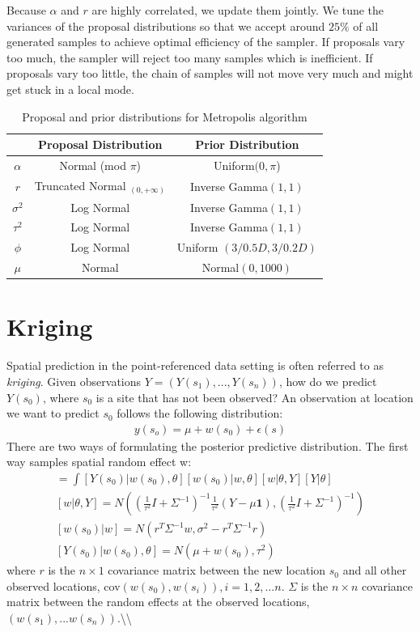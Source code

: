\documentclass[12pt,twoside]{dukestatscithesis}
\theoremstyle{definition}
\theoremstyle{definition}
\theoremstyle{definition}
\theoremstyle{remark}
\begin{document}
Because \(\alpha\) and \(r\) are highly correlated, we update them
jointly. We tune the variances of the proposal distributions so that we
accept around \(25\%\) of all generated samples to achieve optimal
efficiency of the sampler. If proposals vary too much, the sampler will
reject too many samples which is inefficient. If proposals vary too
little, the chain of samples will not move very much and might get stuck
in a local mode.
\begin{table}[H]
\centering
\setlength{\extrarowheight}{10pt}
\begin{tabular}{|c|c|c|}
\hline
 & Proposal Distribution & Prior Distribution\\[8pt]
\hline
$\alpha$ & Normal (mod $\pi$) & Uniform$(0, \pi$)\\[8pt]
\hline
$r$ & Truncated Normal $_{(0, +\infty)}$& Inverse Gamma$(1,1)$\\[8pt]
\hline
$\sigma^2$ & Log Normal & Inverse Gamma$(1,1)$\\[8pt]
\hline
$\tau^2$ & Log Normal & Inverse Gamma$(1,1)$\\[8pt]
\hline
$\phi$ & Log Normal & Uniform $(3/0.5D, 3/0.2D)$\\[8pt]
\hline
$\mu$ & Normal & Normal$(0, 1000)$\\[8pt]
\hline
\end{tabular}
\caption{Proposal and prior distributions for Metropolis algorithm}
\end{table}
\section{Kriging}\label{kriging}

Spatial prediction in the point-referenced data setting is often
referred to as \textit{kriging}. Given observations
\(Y = (Y(s_1), ..., Y(s_n))\), how do we predict \(Y(s_0)\), where
\(s_0\) is a site that has not been observed? An observation at location
we want to predict \(s_0\) follows the following distribution:
\begin{eqnarray*}
y(s_o) = \mu + w(s_0) + \epsilon(s)
\end{eqnarray*}
There are two ways of formulating the posterior predictive distribution.
The first way samples spatial random effect w:
\begin{gather*}
[Y(s_0)|Y] = \int [Y(s_0)|w(s_0),\theta][w(s_0)|w, \theta][w|\theta, Y][Y|\theta]\\
[w|\theta, Y] = N((\frac{1}{\tau^2}I + \Sigma^{-1})^{-1}\frac{1}{\tau^2}(Y-\mu\textbf{1}), (\frac{1}{\tau^2}I + \Sigma^{-1})^{-1})\\
[w(s_0)|w] = N(r^{T}\Sigma^{-1}w, \sigma^{2}-r^{T}\Sigma^{-1}r)\\
[Y(s_0)|w(s_0),\theta] = N(\mu + w(s_0), \tau^2)
\end{gather*}
where \(r\) is the \(n \times 1\) covariance matrix between the new
location \(s_0\) and all other observed locations,
cov\((w(s_0), w(s_i)), i=1, 2, ...n\). \(\Sigma\) is the \(n \times n\)
covariance matrix between the random effects at the observed locations,
\((w(s_1),...w(s_n))\).\textbackslash{}\textbackslash{}
\end{document}

